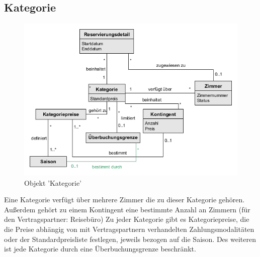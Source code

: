 \documentclass[../../Pflichtenheft.tex]{subfiles}
\begin{document}
    \subsection{Kategorie}
    \begin{figure}[ht!]
        \begin{center}
            \includegraphics[width=0.5\linewidth]{assets/kategorie.png}
            \caption{Objekt 'Kategorie'} \label{kategorie_model}
        \end{center}
    \end{figure}
    Eine Kategorie verfügt über mehrere Zimmer die zu dieser Kategorie gehören.
    Außerdem gehört zu einem Kontingent eine bestimmte Anzahl an Zimmern (für den Vertragspartner: Reisebüro)
    Zu jeder Kategorie gibt es Kategoriepreise, die die Preise abhängig von mit Vertragspartnern verhandelten
    Zahlungsmodalitäten oder der Standardpreisliste festlegen, jeweils bezogen auf die Saison. Des weiteren
    ist jede Kategorie durch eine Überbuchungsgrenze beschränkt.
\end{document}
